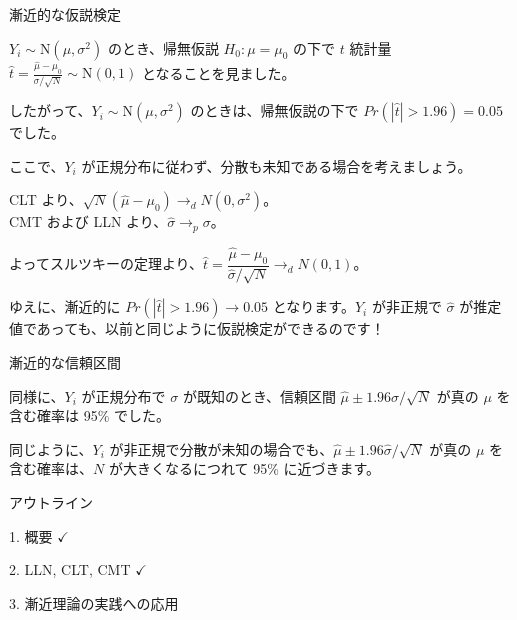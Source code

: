 \documentclass[11pt,handout]{beamer}
\newenvironment{wideitemize}{\itemize\addtolength{\itemsep}{10pt}}{\enditemize}
\begin{document}
\begin{frame}{漸近的な仮説検定}

\begin{wideitemize}
\item
$Y_i \sim \mathrm{N}(\mu,\sigma^2)$ のとき、帰無仮説 $H_0: \mu = \mu_0$ の下で $t$ 統計量 $\hat{t} = \frac{\hat\mu - \mu_0}{\sigma / \sqrt{N}} \sim  \mathrm{N}(0,1)$ となることを見ました。

\pause
\item 
したがって、$Y_i \sim \mathrm{N}(\mu,\sigma^2)$ のときは、帰無仮説の下で $Pr(|\hat t| > 1.96) = 0.05$ でした。

\pause
\item
ここで、$Y_i$ が正規分布に従わず、分散も未知である場合を考えましょう。

\pause
\item
CLT より、$\sqrt{N} (\hat\mu - \mu_0) \rightarrow_d N(0,\sigma^2)$。\\
CMT および LLN より、$\hat\sigma \rightarrow_p \sigma$。

\pause
\item
よってスルツキーの定理より、$\hat{t} = \dfrac{\hat\mu - \mu_0}{ \hat\sigma /\sqrt{N} } \rightarrow_d N(0,1)$。

\pause
\item
ゆえに、漸近的に $Pr( |\hat{t}| > 1.96 ) \rightarrow 0.05$ となります。$Y_i$ が非正規で $\hat\sigma$ が推定値であっても、以前と同じように仮説検定ができるのです！

\end{wideitemize}	
	
\end{frame}

\begin{frame}{漸近的な信頼区間}

\begin{wideitemize}
\item
同様に、$Y_i$ が正規分布で $\sigma$ が既知のとき、信頼区間 $\hat\mu \pm 1.96 \sigma/\sqrt{N}$ が真の $\mu$ を含む確率は 95\% でした。

\pause
\item
同じように、$Y_i$ が非正規で分散が未知の場合でも、$\hat\mu \pm 1.96 \hat\sigma/\sqrt{N}$ が真の $\mu$ を含む確率は、$N$ が大きくなるにつれて 95\% に近づきます。

\end{wideitemize}
	
\end{frame}

\begin{frame}{アウトライン}

\textcolor{red!75!green!50!blue!25!gray}{1. 概要} $\checkmark$
\vspace{0.8cm}

\textcolor{red!75!green!50!blue!25!gray}{2. LLN, CLT, CMT} $\checkmark$
\vspace{0.8cm}

3. 漸近理論の実践への応用

\end{frame}
\end{document}
